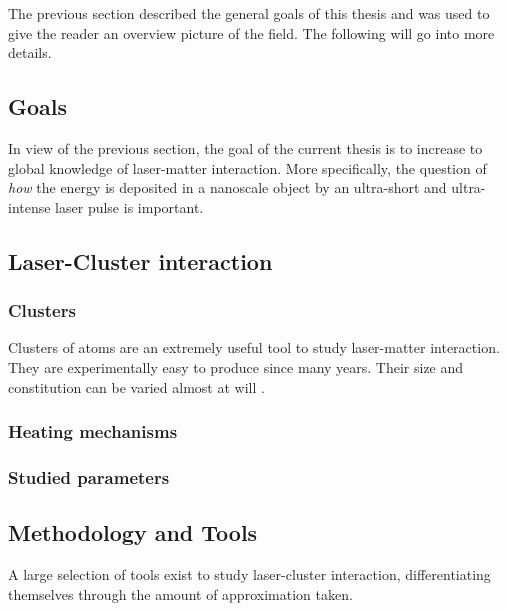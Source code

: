 
The previous section described the general goals of this thesis and was used to
give the reader an overview picture of the field. The following will go
into more details.

\subsection{Goals}
In view of the previous section, the goal of the current thesis is to increase
to global knowledge of laser-matter interaction. More specifically, the
question of \textit{how} the energy is deposited in a nanoscale object by an
ultra-short and ultra-intense laser pulse is important.

\cite{Young2010,Chapman2011}

\subsection{Laser-Cluster interaction}


\subsubsection{Clusters}
\label{section:intro:clusters:clusters}

Clusters of atoms are an extremely useful tool to study laser-matter
interaction. They are experimentally easy to produce since many
years\cite{Haberland1994}. Their size and constitution can be varied almost at
will \cite{Martin1996}.

\cite{Fennel2010}

\subsubsection{Heating mechanisms}
\label{section:intro:clusters:heating}

\subsubsection{Studied parameters}


\subsection{Methodology and Tools}
A large selection of tools exist to study laser-cluster interaction,
differentiating themselves through the amount of approximation taken.

